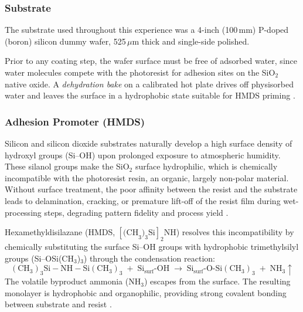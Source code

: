 
\subsubsection{Substrate}

The substrate used throughout this experience was a 4-inch (100\,mm) P-doped
(boron) silicon dummy wafer, 525\,$\mu$m thick and single-side polished.

Prior to any coating step, the wafer surface must be free of adsorbed
water, since
water molecules compete with the photoresist for adhesion sites on the SiO$_2$
native oxide. A \emph{dehydration bake} on a calibrated hot plate
drives off physisorbed water and
leaves the surface in a hydrophobic state suitable for HMDS priming
\cite{FundTechProc2024}.

\subsubsection{Adhesion Promoter (HMDS)}

Silicon and silicon dioxide substrates naturally develop a high
surface density of hydroxyl groups (Si--OH) upon prolonged exposure
to atmospheric humidity. These silanol groups make the SiO$_2$
surface hydrophilic, which is chemically incompatible with the
photoresist resin, an organic, largely non-polar material. Without
surface treatment, the poor affinity between the resist and the
substrate leads to delamination, cracking, or premature lift-off of
the resist film during wet-processing steps, degrading pattern
fidelity and process yield \cite{FundTechProc2024}.

Hexamethyldisilazane (HMDS, $[\text{(CH}_3)_3\text{Si}]_2\text{NH}$)
resolves this incompatibility by chemically substituting the surface
Si--OH groups with hydrophobic trimethylsilyl groups
(Si--OSi(CH$_3$)$_3$) through the condensation reaction:
\begin{equation*}
  (\text{CH}_3)_3\text{Si}\!-\!\text{NH}\!-\!\text{Si}(\text{CH}_3)_3
  \;+\; \text{Si}_{\text{surf}}\text{-OH}
  \;\longrightarrow\;
  \text{Si}_{\text{surf}}\text{-O-Si}(\text{CH}_3)_3
  \;+\; \text{NH}_3 \uparrow
\end{equation*}
The volatile byproduct ammonia (NH$_3$) escapes from the surface. The
resulting monolayer is hydrophobic and organophilic, providing strong
covalent bonding between substrate and resist \cite{FundTechProc2024}.

